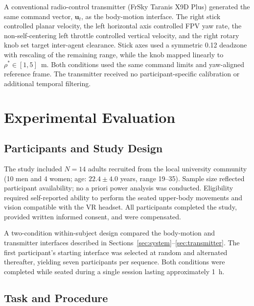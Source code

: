 A conventional radio-control transmitter (FrSky Taranis X9D Plus) generated the same command vector, $\mathbf{u}_t$, as the body-motion interface. The right stick controlled planar
velocity, the left horizontal axis controlled FPV yaw rate, the
non-self-centering left throttle controlled vertical velocity, and the right
rotary knob set target inter-agent clearance. Stick axes used a symmetric 0.12
deadzone with rescaling of the remaining range, while the knob mapped linearly
to $\rho^*\in[1,5]$~m. Both conditions used the same command limits and
yaw-aligned reference frame. The transmitter received no participant-specific
calibration or additional temporal filtering.


\label{sec:experiment}

\section{Experimental Evaluation}
\label{sec:experiment}


\subsection{Participants and Study Design}
\label{sec:participants_design}

The study included $N=14$ adults recruited from the local university
community (10 men and 4 women; age: $22.4 \pm 4.0$ years, range 19--35).
Sample size reflected participant availability; no a priori power analysis was
conducted. Eligibility required self-reported ability to perform the seated
upper-body movements and vision compatible with the VR headset. All
participants completed the study, provided written informed consent, and were
compensated.

A two-condition within-subject design compared the body-motion and transmitter
interfaces described in Sections~\ref{sec:system}--\ref{sec:transmitter}. The
first participant's starting interface was selected at random and alternated
thereafter, yielding seven participants per sequence. Both conditions were
completed while seated during a single session lasting approximately 1~h.




\subsection{Task and Procedure}
\label{sec:task}

